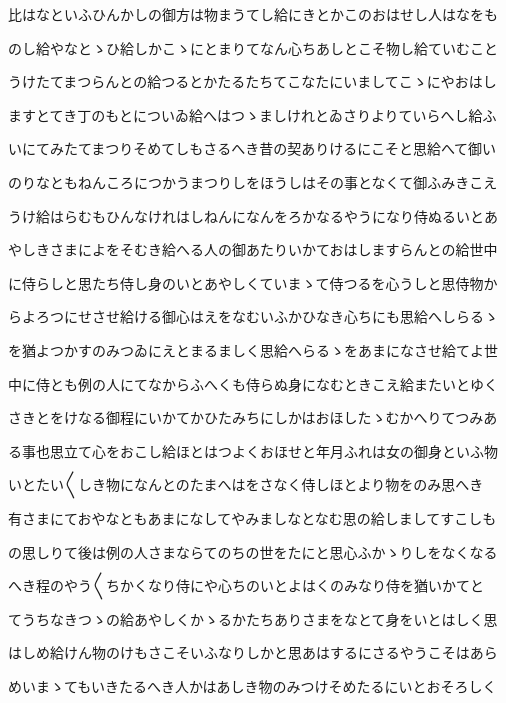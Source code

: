 \documentclass[a4paper,11pt,landscape]{ltjtarticle}
\begin{document}
比はなといふひんかしの御方は物まうてし給にきとかこのおはせし人はなをも
\par\medskip
のし給やなとゝひ給しかこゝにとまりてなん心ちあしとこそ物し給ていむこと
\par\medskip
うけたてまつらんとの給つるとかたるたちてこなたにいましてこゝにやおはし
\par\medskip
ますとてき丁のもとについゐ給へはつゝましけれとゐさりよりていらへし給ふ
\par\medskip
いにてみたてまつりそめてしもさるへき昔の契ありけるにこそと思給へて御い
\par\medskip
のりなともねんころにつかうまつりしをほうしはその事となくて御ふみきこえ
\par\medskip
うけ給はらむもひんなけれはしねんになんをろかなるやうになり侍ぬるいとあ
\par\medskip
やしきさまによをそむき給へる人の御あたりいかておはしますらんとの給世中
\par\medskip
に侍らしと思たち侍し身のいとあやしくていまゝて侍つるを心うしと思侍物か
\par\medskip
らよろつにせさせ給ける御心はえをなむいふかひなき心ちにも思給へしらるゝ
\par\medskip
を猶よつかすのみつゐにえとまるましく思給へらるゝをあまになさせ給てよ世
\par\medskip
中に侍とも例の人にてなからふへくも侍らぬ身になむときこえ給またいとゆく
\par\medskip
さきとをけなる御程にいかてかひたみちにしかはおほしたゝむかへりてつみあ
\par\medskip
る事也思立て心をおこし給ほとはつよくおほせと年月ふれは女の御身といふ物
\par\medskip
いとたい〱しき物になんとのたまへはをさなく侍しほとより物をのみ思へき
\par\medskip
有さまにておやなともあまになしてやみましなとなむ思の給しましてすこしも
\par\medskip
の思しりて後は例の人さまならてのちの世をたにと思心ふかゝりしをなくなる
\par\medskip
へき程のやう〱ちかくなり侍にや心ちのいとよはくのみなり侍を猶いかてと
\par\medskip
てうちなきつゝの給あやしくかゝるかたちありさまをなとて身をいとはしく思
\par\medskip
はしめ給けん物のけもさこそいふなりしかと思あはするにさるやうこそはあら
\par\medskip
めいまゝてもいきたるへき人かはあしき物のみつけそめたるにいとおそろしく
\par\medskip
\end{document}

